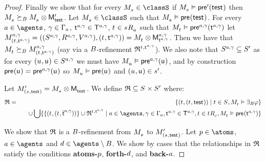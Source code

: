 \begin{proof}
Finally we show that for every $\kPModel{\kStateS} \in \classS$ if $\kPModel{\kStateS} \entails \aPreconditionP(\aStateTest)$ then $\kPModel{\kStateS} \simulatesBs \kPModel{\kStateS} \exec \aPModelP{\aStateTest}$.
Let $\kPModel{\kStateS} \in \classS$ such that $\kPModel{\kStateS} \entails \aPrecondition(\aStateTest)$.
For every $\agentA \in \agents$, $\gamma \in \Gamma_\agentA$, $\aStateT[\agentA, \gamma] \in \aStatesT[\agentA, \gamma]$, $\kStateT \in \kSuccessorsA{\kStateS}$ such that $\kPModel{\kStateT} \entails \aPrecondition[\agentA, \gamma](\aStateT[\agentA, \gamma])$ let $\kPModelAndTuple[\agentA, \gamma]{(\kStateT, \aStateT[\agentA, \gamma])} = \kPModel{\kStateT} \exec \aPModel[\agentA, \gamma]{\aStateT[\agentA, \gamma]}$.
Then we have that $\kPModel{\kStateT} \simulatesBs \kPModel[\agentA, \gamma]{(\kStateT, \aStateT[\agentA, \gamma])}$ (say via a $\agentsB$-refinement $\refinement^{\kStateT, \aStateT[\agentA, \gamma]}$).
We also note that $\kStates[\agentA, \gamma] \subseteq \kStatesP$ as for every $(\kStateU, \aStateU) \in \kStates[\agentA, \gamma]$ we must have $\kPModel{\kStateU} \entails \aPrecondition[\agentA, \gamma](\aStateU)$, and by construction $\aPrecondition(\aStateU) = \aPrecondition[\agentA, \gamma](\aStateU)$ so $\kPModel{\kStateU} \entails \aPrecondition(\aStateU)$ and $(\kStateU, \aStateU) \in \kStateSP$.

Let $\kPModelP{(\kStateS, \aStateTest)} = \kPModel{\kStateS} \exec \aPModel{\aStateTest}$.
We define $\refinement \subseteq \kStates \times \kStatesP$ where:
\begin{eqnarray*}
\refinement &=& 
    \{(\kStateT, (\kStateT, \aStateTest)) \mid \kStateT \in \kStates, \kPModel{\kStateT} \entails \someactsBs \phi \} \\&&\quad \cup 
\bigcup \{\{(\kStateT, (\kStateT, \aPStateT[\agentA, \gamma]))\} \cup \refinement^{\kStateT, \aStateT[\agentA, \gamma]} \mid \agentA \in \agents, \gamma \in \Gamma_\agentA, \aStateT[\agentA, \gamma] \in \aStatesT[\agentA, \gamma], \kStateT \in \kSuccessorsC{\kStateT}, \kPModel{\kStateT} \entails \aPrecondition(\aStateT[\agentA, \gamma])\}
\end{eqnarray*}

We show that $\refinement$ is a $\agentsB$-refinement from $\kPModel{\kStateS}$ to $\kPModelP{(\kStateS, \aStateTest)}$.
Let $\atomP \in \atoms$, $\agentA \in \agents$ and $\agentD \in \agents \setminus \agentsB$.
We show by cases that the relationships in $\refinement$ satisfy the conditions {\bf atoms-$\atomP$}, {\bf forth-$\agentD$}, and {\bf back-$\agentA$}.


\end{proof}
